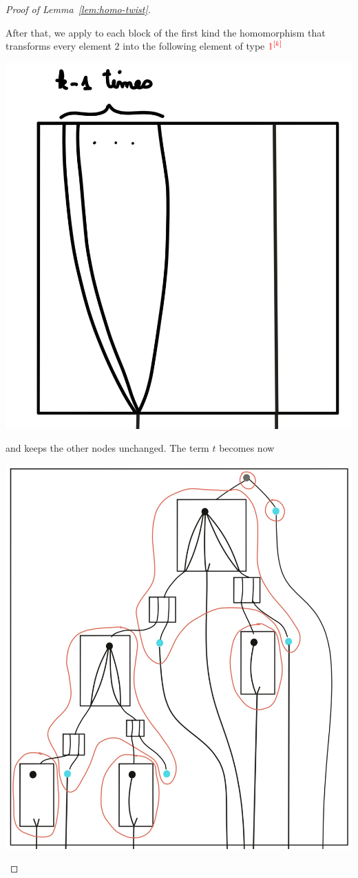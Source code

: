 \begin{proof}[Proof of Lemma~\ref{lem:homo-twist}]
\begin{center}
\end{center}
  After that, we apply to each block of the first kind the homomorphism that transforms every element $2$ into the following element of type $\ranked{\mati k 1}$
  \begin{center}
  \includegraphics[scale=.03]{MyPic24.jpg}
  \end{center}
  and keeps the other nodes unchanged. The term $t$ becomes now
  \begin{center}
  \includegraphics[scale=.09]{MyPic25.jpg}

\end{center}
\end{proof}
